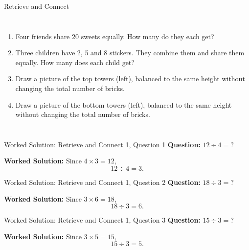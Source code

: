 \documentclass{beamer}
\newcommand{\ashow}[1]{\uncover<2->{\textcolor{red}{\small #1}}}
\newcommand{\ashowq}[1]{\alt<2->{\textcolor{red}{\small #1}}{?}}
\begin{document}
\begin{frame}{Retrieve and Connect}
\begin{columns}[T]
\footnotesize
\vspace{0.2em}
\begin{enumerate}\itemsep1pt
  \item Four friends share 20 sweets equally. How many do they each get? \ashow{5 sweets}
  \item Three children have 2, 5 and 8 stickers. They combine them and share them equally. How many does each child get? \ashow{5 stickers}
  \item Draw a picture of the top towers (left), balanced to the same height without changing the total number of bricks.
  \item Draw a picture of the bottom towers (left), balanced to the same height without changing the total number of bricks.
\end{enumerate}

\end{columns}
\end{frame}

\begin{frame}{Worked Solution: Retrieve and Connect 1, Question 1}
\hypertarget{work-st1}{}
\textbf{Question:} \(12 \div 4 = ?\)

\textbf{Worked Solution:}
Since \(4 \times 3 = 12\),
\[
12 \div 4 = 3.
\]
\end{frame}

\begin{frame}{Worked Solution: Retrieve and Connect 1, Question 2}
\textbf{Question:} \(18 \div 3 = ?\)

\textbf{Worked Solution:}
Since \(3 \times 6 = 18\),
\[
18 \div 3 = 6.
\]
\end{frame}

\begin{frame}{Worked Solution: Retrieve and Connect 1, Question 3}
\textbf{Question:} \(15 \div 3 = ?\)

\textbf{Worked Solution:}
Since \(3 \times 5 = 15\),
\[
15 \div 3 = 5.
\]
\end{frame}
\end{document}

